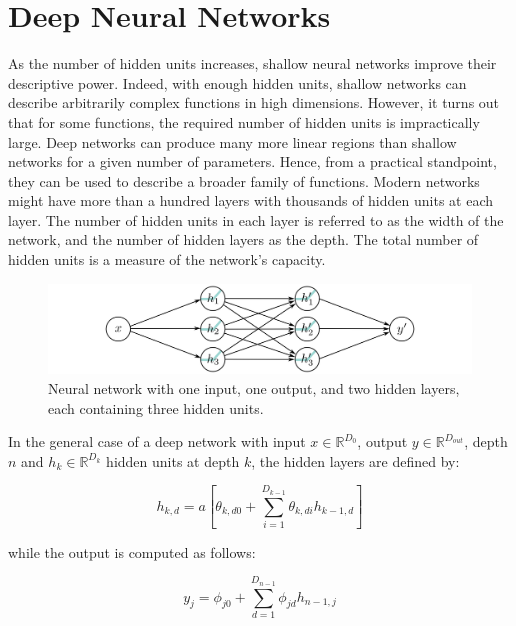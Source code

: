 \pagebreak 

\section{Deep Neural Networks}
As the number of hidden units increases, shallow neural networks improve their descriptive power. Indeed, with enough hidden units, shallow networks can describe arbitrarily complex functions in high dimensions. However, it turns out that for some functions, the required number of hidden units is impractically large. Deep networks can produce many more linear regions than shallow networks for a given number of parameters. Hence, from a practical standpoint, they can be used to describe a broader family of functions. Modern networks might have more than a hundred layers with thousands of hidden units at each layer. The number of hidden units in each layer is referred to as the width of the network, and the number of hidden layers as the depth. The total number of hidden units is a measure of the network’s capacity.

\begin{figure}[H]
    \centering
    \includegraphics[width=0.9\linewidth]{Images/DeepTwoLayer.jpg}
    \caption{Neural network with one input, one output, and two hidden layers, each containing three hidden units.}
    \label{fig:DeepNet}
\end{figure}

\noindent In the general case of a deep network with input $x \in \mathbb{R}^{D_{0}}$, output $y \in \mathbb{R}^{D_{out}}$, depth $n$ and $h_{k} \in \mathbb{R}^{D_{k}}$ hidden units at depth $k$, the hidden layers are defined by:

\begin{equation}
    h_{k, d}=a\left[\theta_{k, d0}+\sum_{i=1}^{D_{k-1}} \theta_{k, d i} h_{k-1, d}\right]
\end{equation}

\noindent while the output is computed as follows:

\begin{equation}
    y_{j}=\phi_{j0}+\sum_{d=1}^{D_{n-1}} \phi_{j d} h_{n-1,j}
\end{equation}

